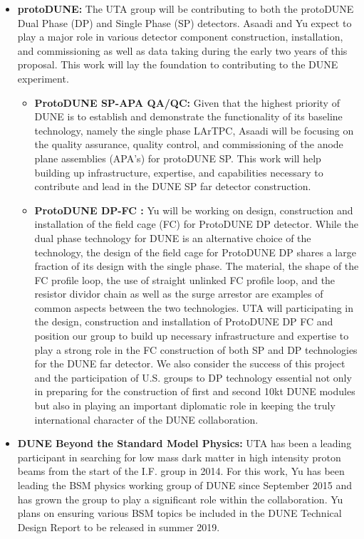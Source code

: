 \begin{itemize}
\item {{\bf protoDUNE:} The UTA group will be contributing to both the protoDUNE Dual Phase (DP) and Single Phase (SP) detectors. Asaadi and Yu expect to play a major role in various detector component construction, installation, and commissioning as well as data taking during the early two years of this proposal. This work will lay the foundation to contributing to the DUNE experiment.}

\begin{itemize}
\item {{\bf ProtoDUNE SP-APA QA/QC:} Given that the highest priority of DUNE is to establish and demonstrate the functionality of its baseline technology, namely the single phase LArTPC, Asaadi will be focusing on the quality assurance, quality control, and commissioning of the anode plane assemblies (APA's) for protoDUNE SP. This work will help building up infrastructure, expertise, and capabilities necessary to contribute and lead in the DUNE SP far detector construction.}

\item {{\bf ProtoDUNE DP-FC :} Yu will be working on design, construction and installation of the field cage (FC) for ProtoDUNE DP detector. While the dual phase technology for DUNE is an alternative choice of the technology, the design of the field cage for ProtoDUNE DP shares a large fraction of its design with the single phase. The material, the shape of the FC profile loop, the use of straight unlinked FC profile loop, and the resistor dividor chain as well as the surge arrestor are examples of common aspects between the two technologies.  UTA will participating in the design, construction and installation of ProtoDUNE DP FC and position our group to build up necessary infrastructure and expertise to play a strong role in the FC construction of both SP and DP technologies for the DUNE far detector.  We also consider the success of this project and the participation of U.S. groups to DP technology essential not only in preparing for the construction of first and second 10kt DUNE modules but also in playing an important diplomatic role in keeping the truly international character of the DUNE collaboration.}

\end{itemize}

\item {{\bf DUNE Beyond the Standard Model Physics:} UTA has been a leading participant in searching for low mass dark matter in high intensity proton beams from the start of the I.F. group in 2014. For this work, Yu has been leading the BSM physics working group of DUNE since September 2015 and has grown the group to play a significant role within the collaboration. Yu plans on ensuring various BSM topics be included in the DUNE Technical Design Report to be released in summer 2019.}

\end{itemize}

